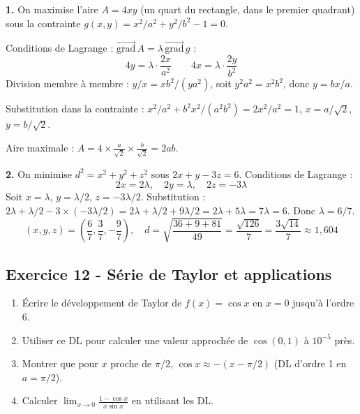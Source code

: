 \documentclass[12pt,a4paper]{article}
\begin{document}
\begin{boitecorrige}
\textbf{1.} On maximise l'aire $A = 4xy$ (un quart du rectangle, dans le premier quadrant) sous la contrainte $g(x,y) = x^2/a^2+y^2/b^2-1=0$.

Conditions de Lagrange : $\overrightarrow{\text{grad}}\,A = \lambda\,\overrightarrow{\text{grad}}\,g$ :
\[
4y = \lambda\cdot\frac{2x}{a^2} \qquad 4x = \lambda\cdot\frac{2y}{b^2}
\]
Division membre à membre : $y/x = x b^2/(y a^2)$, soit $y^2 a^2 = x^2 b^2$, donc $y = bx/a$.

Substitution dans la contrainte : $x^2/a^2 + b^2x^2/(a^2b^2) = 2x^2/a^2 = 1$, $x = a/\sqrt{2}$, $y = b/\sqrt{2}$.

Aire maximale : $A = 4\times\frac{a}{\sqrt{2}}\times\frac{b}{\sqrt{2}} = 2ab$.

\textbf{2.} On minimise $d^2 = x^2+y^2+z^2$ sous $2x+y-3z=6$. Conditions de Lagrange :
\[
2x = 2\lambda,\quad 2y=\lambda,\quad 2z=-3\lambda
\]
Soit $x=\lambda$, $y=\lambda/2$, $z=-3\lambda/2$. Substitution :
$2\lambda+\lambda/2-3\times(-3\lambda/2) = 2\lambda+\lambda/2+9\lambda/2 = 2\lambda+5\lambda = 7\lambda = 6$. Donc $\lambda = 6/7$.
\[
(x,y,z) = \left(\frac{6}{7},\frac{3}{7},-\frac{9}{7}\right), \quad d = \sqrt{\frac{36+9+81}{49}} = \frac{\sqrt{126}}{7} = \frac{3\sqrt{14}}{7} \approx 1{,}604
\]
\end{boitecorrige}

\subsection*{Exercice 12 - Série de Taylor et applications \niveau{\moyen}}

\begin{boiteexercice}
\begin{enumerate}
  \item Écrire le développement de Taylor de $f(x)=\cos x$ en $x=0$ jusqu'à l'ordre 6.
  \item Utiliser ce DL pour calculer une valeur approchée de $\cos(0{,}1)$ à $10^{-5}$ près.
  \item Montrer que pour $x$ proche de $\pi/2$, $\cos x \approx -(x-\pi/2)$ (DL d'ordre 1 en $a=\pi/2$).
  \item Calculer $\lim_{x\to0}\frac{1-\cos x}{x\sin x}$ en utilisant les DL.
\end{enumerate}
\end{boiteexercice}
\end{document}
